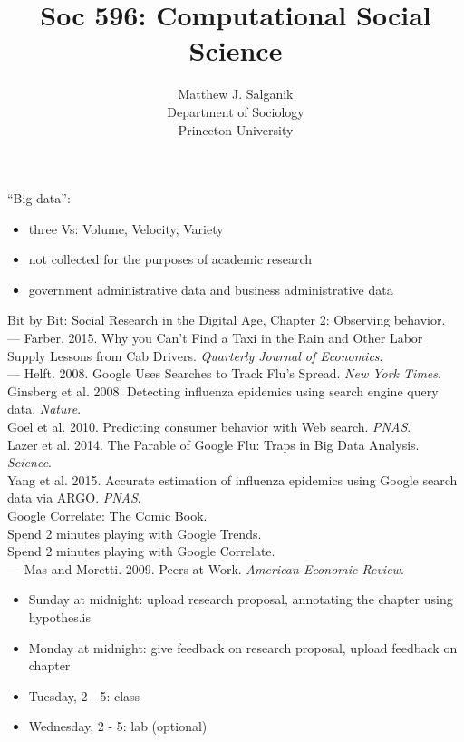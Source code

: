 \documentclass{beamer}
\title[]{Soc 596: Computational Social Science}
\author[]{Matthew J. Salganik\\Department of Sociology\\Princeton University}
\date[]{01-04-Preview for next class (Big Data)
\vfill
\begin{flushright}
\vspace{0.6in}
\texttt{[image: figures/cc.png]}
\end{flushright}
}
\begin{document}
\frame{\titlepage}
\begin{frame}

``Big data'':\\
\begin{itemize}
\item three Vs: Volume, Velocity, Variety
\item not collected for the purposes of academic research
\item government administrative data and business administrative data
\end{itemize}

\end{frame}
\begin{frame}

Bit by Bit: Social Research in the Digital Age, Chapter 2: Observing behavior.\\
---
Farber. 2015. Why you Can't Find a Taxi in the Rain and Other Labor Supply Lessons from Cab Drivers. \textit{Quarterly Journal of Economics}.\\
---
Helft. 2008. Google Uses Searches to Track Flu's Spread. \textit{New York Times}.\\
Ginsberg et al. 2008. Detecting influenza epidemics using search engine query data. \textit{Nature}.\\
Goel et al. 2010. Predicting consumer behavior with Web search. \textit{PNAS}.\\
Lazer et al. 2014. The Parable of Google Flu: Traps in Big Data Analysis. \textit{Science}.\\
Yang et al. 2015. Accurate estimation of influenza epidemics using Google search data via ARGO. \textit{PNAS}.\\
Google Correlate: The Comic Book.\\
Spend 2 minutes playing with Google Trends.\\
Spend 2 minutes playing with Google Correlate.\\
---
Mas and Moretti. 2009. Peers at Work. \textit{American Economic Review}.\\
 
\end{frame}
\begin{frame}

\begin{itemize}
\item Sunday at midnight: upload research proposal, annotating the chapter using hypothes.is
\item Monday at midnight: give feedback on research proposal, upload feedback on chapter
\item Tuesday, 2 - 5: class
\item Wednesday, 2 - 5: lab (optional)
\end{itemize}

\end{frame}
\end{document}
